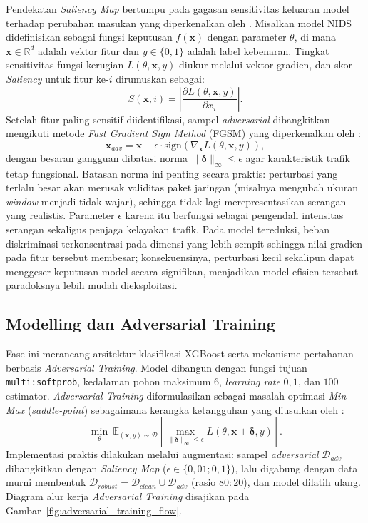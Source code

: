 \documentclass[10pt,twocolumn,a4paper]{extarticle}
\begin{document}
Pendekatan \textit{Saliency Map} bertumpu pada gagasan sensitivitas keluaran model terhadap perubahan masukan yang diperkenalkan oleh \citet{ref_saliency}. Misalkan model NIDS didefinisikan sebagai fungsi keputusan $f(\mathbf{x})$ dengan parameter $\theta$, di mana $\mathbf{x} \in \mathbb{R}^d$ adalah vektor fitur dan $y \in \{0,1\}$ adalah label kebenaran. Tingkat sensitivitas fungsi kerugian $L(\theta,\mathbf{x},y)$ diukur melalui vektor gradien, dan skor \textit{Saliency} untuk fitur ke-$i$ dirumuskan sebagai:
\begin{equation}
S(\mathbf{x},i) = \left| \frac{\partial L(\theta,\mathbf{x},y)}{\partial x_i} \right|.
\end{equation}
Setelah fitur paling sensitif diidentifikasi, sampel \textit{adversarial} dibangkitkan mengikuti metode \textit{Fast Gradient Sign Method} (FGSM) yang diperkenalkan oleh \citet{ref_fgsm}:
\begin{equation}
\mathbf{x}_{adv} = \mathbf{x} + \epsilon \cdot \mathrm{sign}\left( \nabla_{\mathbf{x}} L(\theta,\mathbf{x},y) \right),
\end{equation}
dengan besaran gangguan dibatasi norma $\|\boldsymbol{\delta}\|_\infty \le \epsilon$ agar karakteristik trafik tetap fungsional. Batasan norma ini penting secara praktis: perturbasi yang terlalu besar akan merusak validitas paket jaringan (misalnya mengubah ukuran \textit{window} menjadi tidak wajar), sehingga tidak lagi merepresentasikan serangan yang realistis. Parameter $\epsilon$ karena itu berfungsi sebagai pengendali intensitas serangan sekaligus penjaga kelayakan trafik. Pada model tereduksi, beban diskriminasi terkonsentrasi pada dimensi yang lebih sempit sehingga nilai gradien pada fitur tersebut membesar; konsekuensinya, perturbasi kecil sekalipun dapat menggeser keputusan model secara signifikan, menjadikan model efisien tersebut paradoksnya lebih mudah dieksploitasi.

\subsection{Modelling dan Adversarial Training}
Fase ini merancang arsitektur klasifikasi XGBoost serta mekanisme pertahanan berbasis \textit{Adversarial Training}. Model dibangun dengan fungsi tujuan \texttt{multi:softprob}, kedalaman pohon maksimum $6$, \textit{learning rate} $0{,}1$, dan $100$ estimator. \textit{Adversarial Training} diformulasikan sebagai masalah optimasi \textit{Min-Max} (\textit{saddle-point}) sebagaimana kerangka ketangguhan yang diusulkan oleh \citet{ref_madry}:
\begin{equation}
\min_{\theta}\ \mathbb{E}_{(\mathbf{x},y)\sim\mathcal{D}} \left[ \max_{\|\boldsymbol{\delta}\|_\infty \le \epsilon} L(\theta, \mathbf{x}+\boldsymbol{\delta}, y) \right].
\end{equation}
Implementasi praktis dilakukan melalui augmentasi: sampel \textit{adversarial} $\mathcal{D}_{adv}$ dibangkitkan dengan \textit{Saliency Map} ($\epsilon \in \{0{,}01; 0{,}1\}$), lalu digabung dengan data murni membentuk $\mathcal{D}_{robust} = \mathcal{D}_{clean} \cup \mathcal{D}_{adv}$ (rasio $80:20$), dan model dilatih ulang. Diagram alur kerja \textit{Adversarial Training} disajikan pada Gambar~\ref{fig:adversarial_training_flow}.
\end{document}
